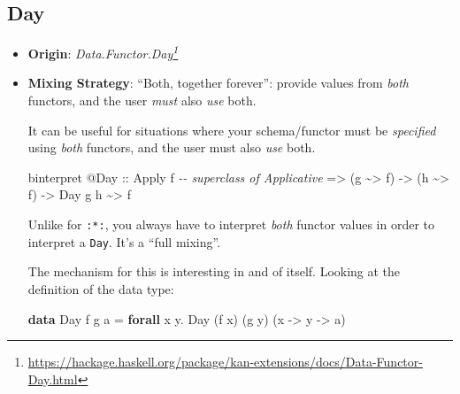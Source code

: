\documentclass[]{article}
\newenvironment{Shaded}{}{}
\newcommand{\CommentTok}[1]{\textcolor[rgb]{0.38,0.63,0.69}{\textit{#1}}}
\newcommand{\DataTypeTok}[1]{\textcolor[rgb]{0.56,0.13,0.00}{#1}}
\newcommand{\KeywordTok}[1]{\textcolor[rgb]{0.00,0.44,0.13}{\textbf{#1}}}
\newcommand{\NormalTok}[1]{#1}
\newcommand{\OperatorTok}[1]{\textcolor[rgb]{0.40,0.40,0.40}{#1}}
\newcommand{\OtherTok}[1]{\textcolor[rgb]{0.00,0.44,0.13}{#1}}
\renewcommand{\href}[2]{#2\footnote{\url{#1}}}
\begin{document}
\subsection{Day}\label{day}

\begin{itemize}
\item
  \textbf{Origin}:
  \emph{\href{https://hackage.haskell.org/package/kan-extensions/docs/Data-Functor-Day.html}{Data.Functor.Day}}
\item
  \textbf{Mixing Strategy}: ``Both, together forever'': provide values from
  \emph{both} functors, and the user \emph{must} also \emph{use} both.

  It can be useful for situations where your schema/functor must be
  \emph{specified} using \emph{both} functors, and the user must also \emph{use}
  both.

\begin{Shaded}
\begin{Highlighting}[]
\NormalTok{binterpret }\OperatorTok{@}\DataTypeTok{Day}
\OtherTok{    ::} \DataTypeTok{Apply}\NormalTok{ f          }\CommentTok{{-}{-} superclass of Applicative}
    \OtherTok{=\textgreater{}}\NormalTok{ (g }\OperatorTok{\textasciitilde{}\textgreater{}}\NormalTok{ f)}
    \OtherTok{{-}\textgreater{}}\NormalTok{ (h }\OperatorTok{\textasciitilde{}\textgreater{}}\NormalTok{ f)}
    \OtherTok{{-}\textgreater{}} \DataTypeTok{Day}\NormalTok{ g h }\OperatorTok{\textasciitilde{}\textgreater{}}\NormalTok{ f}
\end{Highlighting}
\end{Shaded}

  Unlike for \texttt{:*:}, you always have to interpret \emph{both} functor
  values in order to interpret a \texttt{Day}. It's a ``full mixing''.

  The mechanism for this is interesting in and of itself. Looking at the
  definition of the data type:

\begin{Shaded}
\begin{Highlighting}[]
\KeywordTok{data} \DataTypeTok{Day}\NormalTok{ f g a }\OtherTok{=} \KeywordTok{forall}\NormalTok{ x y}\OperatorTok{.} \DataTypeTok{Day}\NormalTok{ (f x) (g y) (x }\OtherTok{{-}\textgreater{}}\NormalTok{ y }\OtherTok{{-}\textgreater{}}\NormalTok{ a)}
\end{Highlighting}
\end{Shaded}


\end{itemize}
\end{document}
